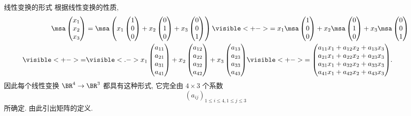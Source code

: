 \begin{frame}{线性变换的形式\noexer}
	\onslide<+->
	根据线性变换的性质,
	\begin{align*}
		\msa\begin{pmatrix}
			x_1\\x_2\\x_3
		\end{pmatrix}
		&=\msa\left(x_1\begin{pmatrix}
			1\\0\\0
		\end{pmatrix}+x_2\begin{pmatrix}
			0\\1\\0
		\end{pmatrix}+x_3\begin{pmatrix}
			0\\0\\1
		\end{pmatrix}\right)
		\visible<+->{=x_1\msa\begin{pmatrix}
			1\\0\\0
		\end{pmatrix}+x_2\msa\begin{pmatrix}
			0\\1\\0
		\end{pmatrix}+x_3\msa\begin{pmatrix}
			0\\0\\1
		\end{pmatrix}}\\
		\visible<+->{=}&\visible<.->{x_1\begin{pmatrix}
			a_{11}\\a_{21}\\a_{31}\\a_{41}
		\end{pmatrix}+x_2\begin{pmatrix}
			a_{12}\\a_{22}\\a_{32}\\a_{42}
		\end{pmatrix}+x_3\begin{pmatrix}
			a_{13}\\a_{23}\\a_{33}\\a_{43}
		\end{pmatrix}}
		\visible<+->{=\begin{pmatrix}
			a_{11}x_1+a_{12}x_2+a_{13}x_3\\
			a_{21}x_1+a_{22}x_2+a_{23}x_3\\
			a_{31}x_1+a_{32}x_2+a_{33}x_3\\
			a_{41}x_1+a_{42}x_2+a_{43}x_3
		\end{pmatrix}}.
	\end{align*}
	因此每个线性变换 $\BR^4\to\BR^3$ 都具有这种形式,
	\onslide<+->
	它完全由 $4\times 3$ 个系数
	\[(a_{ij})_{1\le i\le 4,1\le j\le 3}\]
	所确定.
	\onslide<+->
	由此引出矩阵的定义.
\end{frame}


